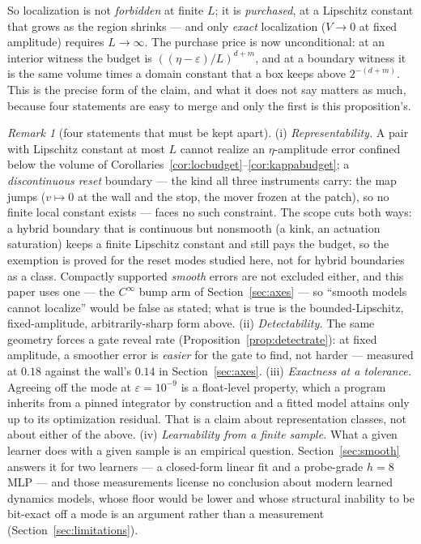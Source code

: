 \documentclass[11pt]{article}
\theoremstyle{definition}
\theoremstyle{remark}
\newtheorem{remark}{Remark}
\begin{document}
So localization is not \emph{forbidden} at finite $L$; it is \emph{purchased}, at a Lipschitz constant that grows as the region shrinks --- and only \emph{exact} localization ($V \to 0$ at fixed amplitude) requires $L \to \infty$. The purchase price is now unconditional: at an interior witness the budget is $((\eta-\varepsilon)/L)^{d+m}$, and at a boundary witness it is the same volume times a domain constant that a box keeps above $2^{-(d+m)}$. This is the precise form of the claim, and what it does not say matters as much, because four statements are easy to merge and only the first is this proposition's.

\begin{remark}[four statements that must be kept apart]
\label{rem:fourstatements}
(i) \emph{Representability.} A pair with Lipschitz constant at most $L$ cannot realize an $\eta$-amplitude error confined below the volume of Corollaries~\ref{cor:locbudget}--\ref{cor:kappabudget}; a \emph{discontinuous reset} boundary --- the kind all three instruments carry: the map jumps ($v \mapsto 0$ at the wall and the stop, the mover frozen at the patch), so no finite local constant exists --- faces no such constraint. The scope cuts both ways: a hybrid boundary that is continuous but nonsmooth (a kink, an actuation saturation) keeps a finite Lipschitz constant and still pays the budget, so the exemption is proved for the reset modes studied here, not for hybrid boundaries as a class. Compactly supported \emph{smooth} errors are not excluded either, and this paper uses one --- the $C^\infty$ bump arm of Section~\ref{sec:axes} --- so ``smooth models cannot localize'' would be false as stated; what is true is the bounded-Lipschitz, fixed-amplitude, arbitrarily-sharp form above.
(ii) \emph{Detectability.} The same geometry forces a gate reveal rate (Proposition~\ref{prop:detectrate}): at fixed amplitude, a smoother error is \emph{easier} for the gate to find, not harder --- measured at $0.18$ against the wall's $0.14$ in Section~\ref{sec:axes}.
(iii) \emph{Exactness at a tolerance.} Agreeing off the mode at $\varepsilon = 10^{-9}$ is a float-level property, which a program inherits from a pinned integrator by construction and a fitted model attains only up to its optimization residual. That is a claim about representation classes, not about either of the above.
(iv) \emph{Learnability from a finite sample.} What a given learner does with a given sample is an empirical question. Section~\ref{sec:smooth} answers it for two learners --- a closed-form linear fit and a probe-grade $h{=}8$ MLP --- and those measurements license no conclusion about modern learned dynamics models, whose floor would be lower and whose structural inability to be bit-exact off a mode is an argument rather than a measurement (Section~\ref{sec:limitations}).
\end{remark}
\end{document}
